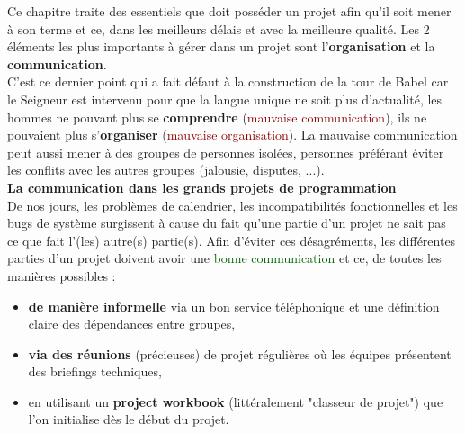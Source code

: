 \documentclass[runningheads]{llncs}
\newcommand{\gre}[1]{\textcolor{darkgreen}{#1}}
\newcommand{\red}[1]{\textcolor{darkred}{#1}}
\begin{document}
Ce chapitre traite des essentiels que doit posséder un projet afin qu'il soit mener à son terme et ce, dans les meilleurs délais 
et avec la meilleure qualité. Les 2 éléments les plus importants à gérer dans un projet sont l'\textbf{organisation} et la 
\textbf{communication}. \\

C'est ce dernier point qui a fait défaut à la construction de la tour de Babel car le Seigneur est
intervenu pour que la langue unique ne soit plus d'actualité, les hommes ne pouvant plus se \textbf{comprendre} (\red{mauvaise 
communication}), ils ne pouvaient plus s'\textbf{organiser} (\red{mauvaise organisation}). La mauvaise communication peut aussi
mener à des groupes de personnes isolées, personnes préférant éviter les conflits avec les autres groupes (jalousie, disputes, 
...). \\

\noindent\textbf{La communication dans les grands projets de programmation} \\
De nos jours, les problèmes de calendrier, les incompatibilités fonctionnelles et les bugs de système surgissent à cause du fait
qu'une partie d'un projet ne sait pas ce que fait l'(les) autre(s) partie(s). Afin d'éviter ces désagréments, les différentes
parties d'un projet doivent avoir une \gre{bonne communication} et ce, de toutes les manières possibles :
\begin{itemize}
\item \textbf{de manière informelle} via un bon service téléphonique et une définition claire des dépendances entre groupes,
\item \textbf{via des réunions} (précieuses) de projet régulières où les équipes présentent des briefings techniques,
\item en utilisant un \textbf{project workbook} (littéralement "classeur de projet") que l'on initialise dès le début du projet.\\
\end{itemize}
\end{document}

